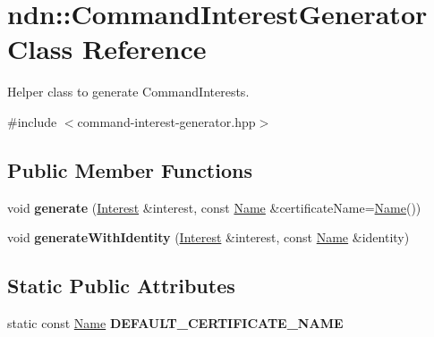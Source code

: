 \hypertarget{classndn_1_1CommandInterestGenerator}{}\section{ndn\+:\+:Command\+Interest\+Generator Class Reference}
\label{classndn_1_1CommandInterestGenerator}


Helper class to generate Command\+Interests.  




{\ttfamily \#include $<$command-\/interest-\/generator.\+hpp$>$}

\subsection*{Public Member Functions}
\begin{DoxyCompactItemize}
\item 
void {\bfseries generate} (\hyperlink{classndn_1_1Interest}{Interest} \&interest, const \hyperlink{classndn_1_1Name}{Name} \&certificate\+Name=\hyperlink{classndn_1_1Name}{Name}())\hypertarget{classndn_1_1CommandInterestGenerator_a56080969187f6d61790b11d338cc9858}{}\label{classndn_1_1CommandInterestGenerator_a56080969187f6d61790b11d338cc9858}

\item 
void {\bfseries generate\+With\+Identity} (\hyperlink{classndn_1_1Interest}{Interest} \&interest, const \hyperlink{classndn_1_1Name}{Name} \&identity)\hypertarget{classndn_1_1CommandInterestGenerator_a08201e9785d63f92d202fd862eb282c6}{}\label{classndn_1_1CommandInterestGenerator_a08201e9785d63f92d202fd862eb282c6}

\end{DoxyCompactItemize}
\subsection*{Static Public Attributes}
\begin{DoxyCompactItemize}
\item 
static const \hyperlink{classndn_1_1Name}{Name} {\bfseries D\+E\+F\+A\+U\+L\+T\+\_\+\+C\+E\+R\+T\+I\+F\+I\+C\+A\+T\+E\+\_\+\+N\+A\+ME}\hypertarget{classndn_1_1CommandInterestGenerator_a22fd55b84c1c5c6f141c08928acf7ff9}{}\label{classndn_1_1CommandInterestGenerator_a22fd55b84c1c5c6f141c08928acf7ff9}

\end{DoxyCompactItemize}


